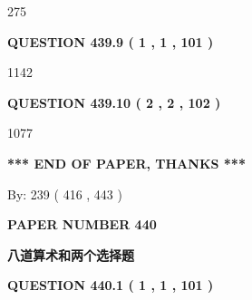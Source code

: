 \documentclass{ctexart}
\begin{document}
  
 
 
\noindent{}

275
 
 
  
\vspace{0.2in}
  
{\textbf{\Large{QUESTION
439.9 
 ( 1 , 1 , 101 )
}}}
  
  
 
 
\noindent{}

1142
 
 
  
\vspace{0.2in}
  
{\textbf{\Large{QUESTION
439.10 
 ( 2 , 2 , 102 )
}}}
  
  
 
 
\noindent{}

1077
 
 
   
   
 \vspace{0.2in}
 
   
   
   
   
\vspace{1.0in} 
{\textbf{\large{ *** END OF PAPER, THANKS *** }}} 
   
   
\hspace{1.0in} By: 
 239 ( 416 ,  443 )
   
   
   
   
\newpage 
\setcounter{page}{ 
   440001 } 
   
   
   
   
 {\textbf{ \Large{ PAPER NUMBER  440  }}}
   
   
\vspace{0.2in}
   
   
   
   
   
   
 \vspace{0.2in}
{\LARGE {\textbf{ 八道算术和两个选择题}}}
   
   
  
\vspace{0.2in}
  
{\textbf{\Large{QUESTION
440.1 
 ( 1 , 1 , 101 )
}}}
  
\end{document}
